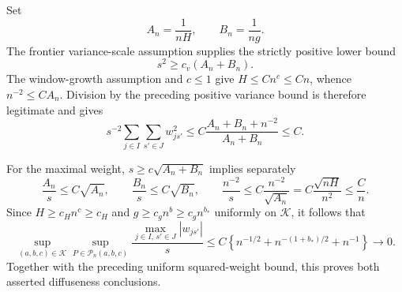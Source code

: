 Set
\[
 A_n=\frac{1}{nH},
 \qquad
 B_n=\frac{1}{ng}.
\]
The frontier variance-scale assumption supplies the strictly positive lower bound
\[
 s^2\ge c_v(A_n+B_n).
\]
The window-growth assumption and \(c\le1\) give \(H\le Cn^c\le Cn\), whence \(n^{-2}\le CA_n\).  Division by the preceding positive variance bound is therefore legitimate and gives
\[
 s^{-2}\sum_{j\in I}\sum_{s'\in J}w_{js'}^2
 \le C\frac{A_n+B_n+n^{-2}}{A_n+B_n}
 \le C.
\]

For the maximal weight, \(s\ge c\sqrt{A_n+B_n}\) implies separately
\[
 \frac{A_n}{s}\le C\sqrt{A_n},
 \qquad
 \frac{B_n}{s}\le C\sqrt{B_n},
 \qquad
 \frac{n^{-2}}{s}
 \le C\frac{n^{-2}}{\sqrt{A_n}}
 =C\frac{\sqrt{nH}}{n^2}
 \le \frac{C}{n}.
\]
Since \(H\ge c_Hn^c\ge c_H\) and \(g\ge c_gn^b\ge c_gn^{b_*}\) uniformly on \(\mathcal K\), it follows that
\[
 \sup_{(a,b,c)\in\mathcal K}\sup_{P\in\mathcal P_n(a,b,c)}
 \frac{\max_{j\in I,\,s'\in J}|w_{js'}|}{s}
 \le C\left\{n^{-1/2}+n^{-(1+b_*)/2}+n^{-1}\right\}
 \longrightarrow0.
\]
Together with the preceding uniform squared-weight bound, this proves both asserted diffuseness conclusions.
